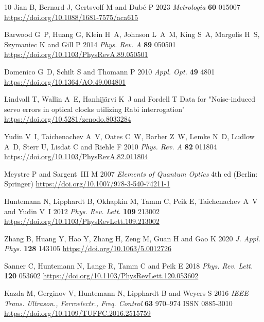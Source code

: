 \documentclass[10pt,a4paper]{iopart}
\begin{document}
\begin{thebibliography}{10}
Jian B, Bernard J, Gertsvolf M and Dub{\'{e}} P 2023 {\em Metrologia\/} {\bf
  60} 015007 \urlprefix\url{https://doi.org/10.1088/1681-7575/aca615}

Barwood G~P, Huang G, Klein H~A, Johnson L~A~M, King S~A, Margolis H~S,
  Szymaniec K and Gill P 2014 {\em Phys. Rev. A\/} {\bf 89} 050501
  \urlprefix\url{https://doi.org/10.1103/PhysRevA.89.050501}

Domenico G~D, Schilt S and Thomann P 2010 {\em Appl. Opt.\/} {\bf 49} 4801
  \urlprefix\url{https://doi.org/10.1364/AO.49.004801}

Lindvall T, Wallin A~E, Hanhij\"arvi K~J and Fordell T {D}ata for
  "{N}oise-induced servo errors in optical clocks utilizing {R}abi
  interrogation" \urlprefix\url{https://doi.org/10.5281/zenodo.8033284}

Yudin V~I, Taichenachev A~V, Oates C~W, Barber Z~W, Lemke N~D, Ludlow A~D,
  Sterr U, Lisdat C and Riehle F 2010 {\em Phys. Rev. A\/} {\bf 82} 011804
  \urlprefix\url{https://doi.org/10.1103/PhysRevA.82.011804}

Meystre P and Sargent~{III} M 2007 {\em {E}lements of {Q}uantum {O}ptics\/} 4th
  ed (Berlin: Springer)
  \urlprefix\url{https://doi.org/10.1007/978-3-540-74211-1}

Huntemann N, Lipphardt B, Okhapkin M, Tamm C, Peik E, Taichenachev A~V and
  Yudin V~I 2012 {\em Phys. Rev. Lett.\/} {\bf 109} 213002
  \urlprefix\url{https://doi.org/10.1103/PhysRevLett.109.213002}

Zhang B, Huang Y, Hao Y, Zhang H, Zeng M, Guan H and Gao K 2020 {\em J. Appl.
  Phys.\/} {\bf 128} 143105 \urlprefix\url{https://doi.org/10.1063/5.0012726}

Sanner C, Huntemann N, Lange R, Tamm C and Peik E 2018 {\em Phys. Rev. Lett.\/}
  {\bf 120} 053602
  \urlprefix\url{https://doi.org/10.1103/PhysRevLett.120.053602}

Kazda M, Gerginov V, Huntemann N, Lipphardt B and Weyers S 2016 {\em {IEEE}
  Trans. Ultrason., Ferroelectr., Freq. Control\/} {\bf 63} 970--974 ISSN
  0885-3010 \urlprefix\url{https://doi.org/10.1109/TUFFC.2016.2515759}

\end{thebibliography}
\end{document}
